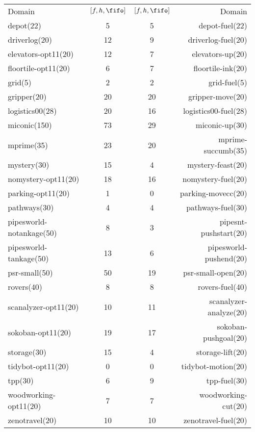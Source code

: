\begin{center}
\begin{tabular}{|lc|cr|}
Domain & $[f,h,\fifo]$ & $[f,h,\fifo]$ & Domain\\
depot(22) & 5 & 5 & depot-fuel(22)\\
driverlog(20) & 12 & 9 & driverlog-fuel(20)\\
elevators-opt11(20) & 12 & 7 & elevators-up(20)\\
floortile-opt11(20) & 6 & 7 & floortile-ink(20)\\
grid(5) & 2 & 2 & grid-fuel(5)\\
gripper(20) & 20 & 20 & gripper-move(20)\\
logistics00(28) & 20 & 16 & logistics00-fuel(28)\\
miconic(150) & 73 & 29 & miconic-up(30)\\
mprime(35) & 23 & 20 & mprime-succumb(35)\\
mystery(30) & 15 & 4 & mystery-feast(20)\\
nomystery-opt11(20) & 18 & 16 & nomystery-fuel(20)\\
parking-opt11(20) & 1 & 0 & parking-movecc(20)\\
pathways(30) & 4 & 4 & pathways-fuel(30)\\
pipesworld-notankage(50) & 8 & 3 & pipesnt-pushstart(20)\\
pipesworld-tankage(50) & 13 & 6 & pipesworld-pushend(20)\\
psr-small(50) & 50 & 19 & psr-small-open(20)\\
rovers(40) & 8 & 8 & rovers-fuel(40)\\
scanalyzer-opt11(20) & 10 & 11 & scanalyzer-analyze(20)\\
sokoban-opt11(20) & 19 & 17 & sokoban-pushgoal(20)\\
storage(30) & 15 & 4 & storage-lift(20)\\
tidybot-opt11(20) & 0 & 0 & tidybot-motion(20)\\
tpp(30) & 6 & 9 & tpp-fuel(30)\\
woodworking-opt11(20) & 7 & 7 & woodworking-cut(20)\\
zenotravel(20) & 10 & 10 & zenotravel-fuel(20)\\
\end{tabular}
\end{center}
